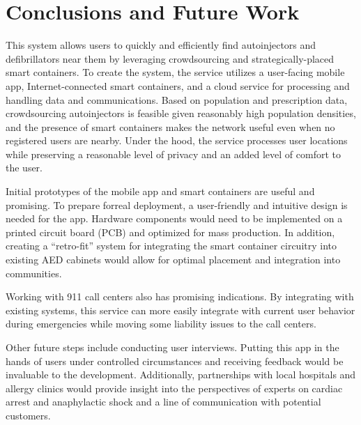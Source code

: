 \section{Conclusions and Future Work} \label{conclusions}

\onehalfspacing

This system allows users to quickly and efficiently find autoinjectors and defibrillators near them by leveraging crowdsourcing and strategically-placed smart containers. To create the system, the service utilizes a user-facing mobile app, Internet-connected smart containers, and a cloud service for processing and handling data and communications. Based on population and prescription data, crowdsourcing autoinjectors is feasible given reasonably high population densities, and the presence of smart containers makes the network useful even when no registered users are nearby. Under the hood, the service processes user locations while preserving a reasonable level of privacy and an added level of comfort to the user. 

Initial prototypes of the mobile app and smart containers are useful and promising. To prepare forreal deployment, a user-friendly and intuitive design is needed for the app. Hardware components would need to be implemented on a printed circuit board (PCB) and optimized for mass production. In addition, creating a ``retro-fit'' system for integrating the smart container circuitry into existing AED cabinets would allow for optimal placement and integration into communities.

Working with 911 call centers also has promising indications. By integrating with existing systems, this service can more easily integrate with current user behavior during emergencies while moving some liability issues to the call centers.

Other future steps include conducting user interviews. Putting this app in the hands of users under controlled circumstances and receiving feedback would be invaluable to the development. Additionally, partnerships with local hospitals and allergy clinics would provide insight into the perspectives of experts on cardiac arrest and anaphylactic shock and a line of communication with potential customers.
